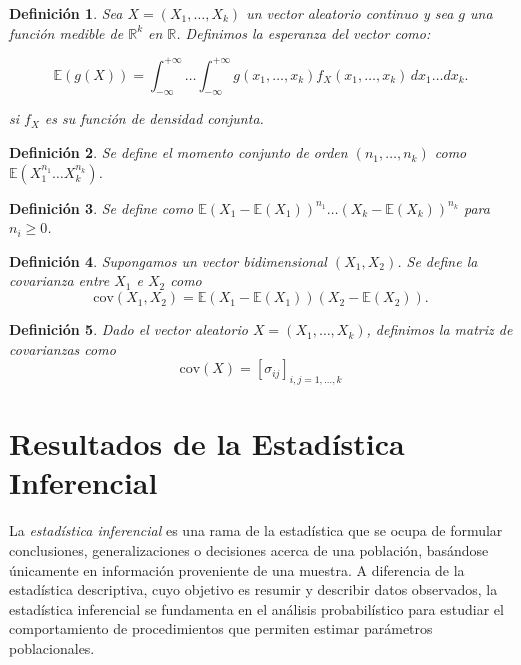 \documentclass{report}
\newtheorem{dfn}{Definición}[section]
\begin{document}
\begin{dfn}\label{dfn:expected_value_vector_cont}
Sea $X = (X_1, \dots, X_k)$ un vector aleatorio continuo y sea $g$ una función medible de $\mathbb{R}^k$ en $\mathbb{R}$. 
Definimos la esperanza del vector como:

\[
\mathbb{E}(g(X)) = \int_{-\infty}^{+\infty} \dots \int_{-\infty}^{+\infty} g(x_1,\dots,x_k)f_X(x_1,\dots,x_k) \,dx_1 \dots dx_k.
\]

si $f_X$ es su función de densidad conjunta.
\end{dfn}

\begin{dfn} \label{dfn:momento_conjunto}  Se define el momento conjunto de orden $(n_1,\dots,n_k)$ como $\mathbb{E}(X_1^{n_1} \dots X_k^{n_k})$.
\end{dfn}


\begin{dfn} \label{dfn:momento_conjunto_central}  Se define como $\mathbb{E}(X_1 - \mathbb{E}(X_1))^{n_1} \dots (X_k - \mathbb{E}(X_k))^{n_k}$ para $n_i \geq 0$.
\end{dfn}


\begin{dfn} \label{dfn:covarianza} Supongamos un vector bidimensional $(X_1,X_2)$. Se define la covarianza entre $X_1$ e $X_2$ como
\[
\mathrm{cov}(X_1, X_2) = \mathbb{E}(X_1 - \mathbb{E}(X_1))(X_2 - \mathbb{E}(X_2)).
\]
\end{dfn}

\begin{dfn} \label{dfn:matriz_covarianzas} Dado el vector aleatorio $X = (X_1,\dots,X_k)$, definimos la matriz de covarianzas como
\[
\mathrm{cov}(X) = [\sigma_{ij}]_{i,j=1,\dots,k}
\]
\end{dfn}

\section{Resultados de la Estadística Inferencial}


La \emph{estadística inferencial} es una rama de la estadística que se ocupa de formular conclusiones, generalizaciones o decisiones acerca de una población, basándose únicamente 
en información proveniente de una muestra. A diferencia de la estadística descriptiva, cuyo objetivo es resumir y describir datos observados, la estadística inferencial se 
fundamenta en el análisis probabilístico para estudiar el comportamiento de procedimientos que permiten estimar parámetros poblacionales.
\end{document}
